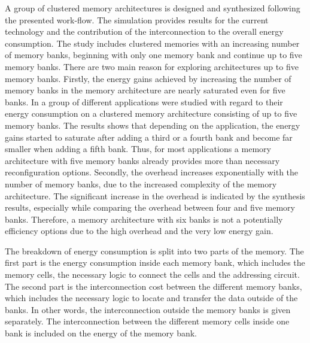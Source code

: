 A group of clustered memory architectures is designed and synthesized following the presented work-flow.
The simulation provides results for the current technology and the contribution of the interconnection to the overall energy consumption.
The study includes clustered memories with an increasing number of memory banks, beginning with only one memory bank and continue up to five memory banks.
There are two main reason for exploring architectures up to five memory banks.
Firstly, the energy gains achieved by increasing the number of memory banks in the memory architecture are nearly saturated even for five banks.
In \cite{filippopoulos2013exploration} a group of different applications were studied with regard to their energy consumption on a clustered memory architecture consisting of up to five memory banks.
The results shows that depending on the application, the energy gains started to saturate after adding a third or a fourth bank and become far smaller when adding a fifth bank.
Thus, for most applications a memory architecture with five memory banks already provides more than necessary reconfiguration options.  
Secondly, the overhead increases exponentially with the number of memory banks, due to the increased complexity of the memory architecture. 
The significant increase in the overhead is indicated by the synthesis results, especially while comparing the overhead between four and five memory banks.
Therefore, a memory architecture with six banks is not a potentially efficiency options due to the high overhead and the very low energy gain.

The breakdown of energy consumption is split into two parts of the memory.
The first part is the energy consumption inside each memory bank, which includes the memory cells, the necessary logic to connect the cells and the addressing circuit.
The second part is the interconnection cost between the different memory banks, which includes the necessary logic to locate and transfer the data outside of the banks. 
In other words, the interconnection outside the memory banks is given separately. 
The interconnection between the different memory cells inside one bank is included on the energy of the memory bank.

